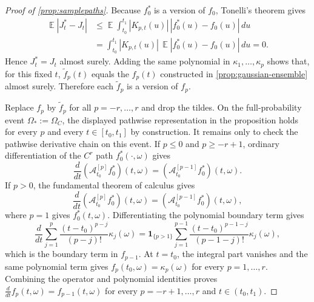 \documentclass[11pt,a4paper]{article}
\theoremstyle{definition}
\theoremstyle{remark}
\DeclareMathOperator{\E}{\mathbb{E}}
\begin{document}
\begin{proof}[Proof of \cref{prop:samplepaths}]
Because \(f_0^\ast\) is a version of \(f_0\), Tonelli's theorem gives
\begin{align*}
\E|J_t^\ast-J_t|
&\le \E\int_{t_0}^{t_1}|K_{p,t}(u)|\,|f_0^\ast(u)-f_0(u)|\,du\\
&=\int_{t_0}^{t_1}|K_{p,t}(u)|\,\E|f_0^\ast(u)-f_0(u)|\,du
=0.
\end{align*}
Hence \(J_t^\ast=J_t\) almost surely. Adding the same polynomial in \(\kappa_1,\ldots,\kappa_p\) shows that, for this fixed \(t\), \(\tilde f_p(t)\) equals the \(f_p(t)\) constructed in \cref{prop:gaussian-ensemble} almost surely. Therefore each \(\tilde f_p\) is a version of \(f_p\).

Replace \(f_p\) by \(\tilde f_p\) for all \(p=-r,\ldots,r\) and drop the tildes. On the full-probability event \(\Omega_\ast:=\Omega_C\), the displayed pathwise representation in the proposition holds for every \(p\) and every \(t\in[t_0,t_1]\) by construction. It remains only to check the pathwise derivative chain on this event. If \(p\le0\) and \(p\ge-r+1\), ordinary differentiation of the \(C^r\) path \(f_0^\ast(\cdot,\omega)\) gives
\[
\frac{d}{dt}(\mathcal A_{t_0}^{[p]}f_0^\ast)(t,\omega)=(\mathcal A_{t_0}^{[p-1]}f_0^\ast)(t,\omega).
\]
If \(p>0\), the fundamental theorem of calculus gives
\[
\frac{d}{dt}(\mathcal A_{t_0}^{[p]}f_0^\ast)(t,\omega)=(\mathcal A_{t_0}^{[p-1]}f_0^\ast)(t,\omega),
\]
where \(p=1\) gives \(f_0^\ast(t,\omega)\). Differentiating the polynomial boundary term gives
\[
\frac{d}{dt}\sum_{j=1}^{p}\frac{(t-t_0)^{p-j}}{(p-j)!}\kappa_j(\omega)
=\mathbf 1_{\{p>1\}}\sum_{j=1}^{p-1}\frac{(t-t_0)^{p-1-j}}{(p-1-j)!}\kappa_j(\omega),
\]
which is the boundary term in \(f_{p-1}\). At \(t=t_0\), the integral part vanishes and the same polynomial term gives \(f_p(t_0,\omega)=\kappa_p(\omega)\) for every \(p=1,\ldots,r\). Combining the operator and polynomial identities proves \(\frac{d}{dt}f_p(t,\omega)=f_{p-1}(t,\omega)\) for every \(p=-r+1,\ldots,r\) and \(t\in(t_0,t_1)\).
\end{proof}
\end{document}
